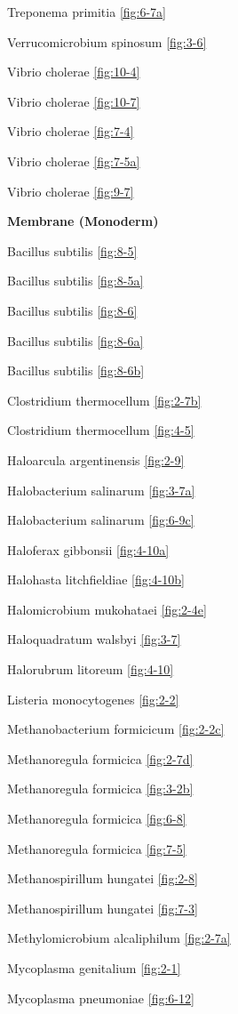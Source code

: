 \documentclass[]{tufte-book}
\begin{document}
Treponema primitia \ref{fig:6-7a}

Verrucomicrobium spinosum \ref{fig:3-6}

Vibrio cholerae \ref{fig:10-4}

Vibrio cholerae \ref{fig:10-7}

Vibrio cholerae \ref{fig:7-4}

Vibrio cholerae \ref{fig:7-5a}

Vibrio cholerae \ref{fig:9-7}

\textbf{Membrane (Monoderm)}

Bacillus subtilis \ref{fig:8-5}

Bacillus subtilis \ref{fig:8-5a}

Bacillus subtilis \ref{fig:8-6}

Bacillus subtilis \ref{fig:8-6a}

Bacillus subtilis \ref{fig:8-6b}

Clostridium thermocellum \ref{fig:2-7b}

Clostridium thermocellum \ref{fig:4-5}

Haloarcula argentinensis \ref{fig:2-9}

Halobacterium salinarum \ref{fig:3-7a}

Halobacterium salinarum \ref{fig:6-9c}

Haloferax gibbonsii \ref{fig:4-10a}

Halohasta litchfieldiae \ref{fig:4-10b}

Halomicrobium mukohataei \ref{fig:2-4e}

Haloquadratum walsbyi \ref{fig:3-7}

Halorubrum litoreum \ref{fig:4-10}

Listeria monocytogenes \ref{fig:2-2}

Methanobacterium formicicum \ref{fig:2-2c}

Methanoregula formicica \ref{fig:2-7d}

Methanoregula formicica \ref{fig:3-2b}

Methanoregula formicica \ref{fig:6-8}

Methanoregula formicica \ref{fig:7-5}

Methanospirillum hungatei \ref{fig:2-8}

Methanospirillum hungatei \ref{fig:7-3}

Methylomicrobium alcaliphilum \ref{fig:2-7a}

Mycoplasma genitalium \ref{fig:2-1}

Mycoplasma pneumoniae \ref{fig:6-12}
\end{document}

